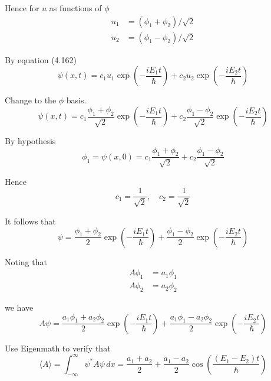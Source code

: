 Hence for $u$ as functions of $\phi$
\begin{align*}
u_1&=(\phi_1+\phi_2)/\sqrt2
\\
u_2&=(\phi_1-\phi_2)/\sqrt2
\end{align*}

By equation (4.162)
\begin{equation*}
\psi(x,t)
=c_1u_1\exp\left(-\frac{iE_1t}{\hbar}\right)
+c_2u_2\exp\left(-\frac{iE_2t}{\hbar}\right)
\end{equation*}

Change to the $\phi$ basis.
\begin{equation*}
\psi(x,t)
=c_1\frac{\phi_1+\phi_2}{\sqrt2}\exp\left(-\frac{iE_1t}{\hbar}\right)
+c_2\frac{\phi_1-\phi_2}{\sqrt2}\exp\left(-\frac{iE_2t}{\hbar}\right)
\end{equation*}

By hypothesis
\begin{equation*}
\phi_1=\psi(x,0)=c_1\frac{\phi_1+\phi_2}{\sqrt2}+c_2\frac{\phi_1-\phi_2}{\sqrt2}
\end{equation*}

Hence
\begin{equation*}
c_1=\frac{1}{\sqrt2},\quad c_2=\frac{1}{\sqrt2}
\end{equation*}

It follows that
\begin{equation*}
\psi
=\frac{\phi_1+\phi_2}{2}\exp\left(-\frac{iE_1t}{\hbar}\right)
+\frac{\phi_1-\phi_2}{2}\exp\left(-\frac{iE_2t}{\hbar}\right)
\end{equation*}

Noting that
\begin{align*}
A\phi_1&=a_1\phi_1
\\
A\phi_2&=a_2\phi_2
\end{align*}

we have
\begin{equation*}
A\psi
=\frac{a_1\phi_1+a_2\phi_2}{2}\exp\left(-\frac{iE_1t}{\hbar}\right)
+\frac{a_1\phi_1-a_2\phi_2}{2}\exp\left(-\frac{iE_2t}{\hbar}\right)
\end{equation*}

Use Eigenmath to verify that
\begin{equation*}
\langle A\rangle
=\int_{-\infty}^\infty \psi^*A\psi\,dx
=\frac{a_1+a_2}{2}+\frac{a_1-a_2}{2}\cos\left(\frac{(E_1-E_2)t}{\hbar}\right)
\end{equation*}



